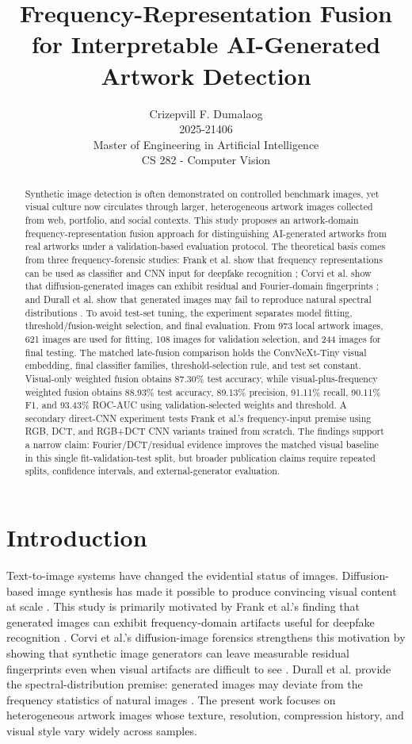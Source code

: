 ﻿\documentclass[10pt,twocolumn]{article}
\title{Frequency-Representation Fusion for Interpretable AI-Generated Artwork Detection}
\author{Crizepvill F. Dumalaog\\
2025-21406\\
Master of Engineering in Artificial Intelligence\\
CS 282 - Computer Vision}
\date{}
\begin{document}
\maketitle

\begin{abstract}
Synthetic image detection is often demonstrated on controlled benchmark images, yet visual culture now circulates through larger, heterogeneous artwork images collected from web, portfolio, and social contexts. This study proposes an artwork-domain frequency-representation fusion approach for distinguishing AI-generated artworks from real artworks under a validation-based evaluation protocol. The theoretical basis comes from three frequency-forensic studies: Frank et al. show that frequency representations can be used as classifier and CNN input for deepfake recognition \cite{frank}; Corvi et al. show that diffusion-generated images can exhibit residual and Fourier-domain fingerprints \cite{corvi}; and Durall et al. show that generated images may fail to reproduce natural spectral distributions \cite{durall}. To avoid test-set tuning, the experiment separates model fitting, threshold/fusion-weight selection, and final evaluation. From 973 local artwork images, 621 images are used for fitting, 108 images for validation selection, and 244 images for final testing. The matched late-fusion comparison holds the ConvNeXt-Tiny visual embedding, final classifier families, threshold-selection rule, and test set constant. Visual-only weighted fusion obtains 87.30\% test accuracy, while visual-plus-frequency weighted fusion obtains 88.93\% test accuracy, 89.13\% precision, 91.11\% recall, 90.11\% F1, and 93.43\% ROC-AUC using validation-selected weights and threshold. A secondary direct-CNN experiment tests Frank et al.'s frequency-input premise using RGB, DCT, and RGB+DCT CNN variants trained from scratch. The findings support a narrow claim: Fourier/DCT/residual evidence improves the matched visual baseline in this single fit-validation-test split, but broader publication claims require repeated splits, confidence intervals, and external-generator evaluation.
\end{abstract}

\section{Introduction}
Text-to-image systems have changed the evidential status of images. Diffusion-based image synthesis has made it possible to produce convincing visual content at scale \cite{rombach}. This study is primarily motivated by Frank et al.'s finding that generated images can exhibit frequency-domain artifacts useful for deepfake recognition \cite{frank}. Corvi et al.'s diffusion-image forensics strengthens this motivation by showing that synthetic image generators can leave measurable residual fingerprints even when visual artifacts are difficult to see \cite{corvi}. Durall et al. provide the spectral-distribution premise: generated images may deviate from the frequency statistics of natural images \cite{durall}. The present work focuses on heterogeneous artwork images whose texture, resolution, compression history, and visual style vary widely across samples.
\end{document}
